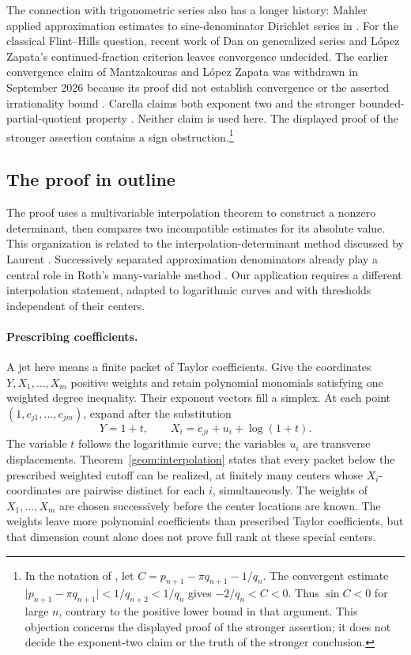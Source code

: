 \documentclass[11pt]{article}
\theoremstyle{definition}
\theoremstyle{remark}
\numberwithin{equation}{section}
\begin{document}
The connection with trigonometric series also has a longer history:
Mahler applied approximation estimates to sine-denominator Dirichlet
series in \cite[Section~16]{mahler1953}. For the classical Flint--Hills
question, recent work of Dan on generalized series \cite{Dan2026}
and L\'opez Zapata's continued-fraction criterion
\cite{LopezZapata2026} leaves convergence undecided. The earlier
convergence claim of Mantzakouras and L\'opez Zapata was withdrawn
in September 2026 because its proof did not establish convergence
or the asserted irrationality bound \cite{MantzakourasLopezZapata2025}.
Carella claims both exponent two and the stronger bounded-partial-quotient
property \cite{Carella2022}. Neither claim is used here. The displayed
proof of the stronger assertion contains a sign obstruction.\footnote{In the notation of
\cite[Theorem~8.1, Equations~(52) and~(55)]{Carella2022}, let
\(C=p_{n+1}-\pi q_{n+1}-1/q_n\). The convergent estimate
\(\lvert p_{n+1}-\pi q_{n+1}\rvert<1/q_{n+2}<1/q_n\)
gives \(-2/q_n<C<0\). Thus \(\sin C<0\) for large \(n\), contrary
to the positive lower bound in that argument. This objection concerns
the displayed proof of the stronger assertion; it does not decide the
exponent-two claim or the truth of the stronger conclusion.}

\subsection{The proof in outline}

The proof uses a multivariable interpolation theorem to construct a
nonzero determinant, then compares two incompatible estimates for its
absolute value. This organization is related to the interpolation-determinant
method discussed by Laurent \cite[Section~6]{laurent1991}.
Successively separated approximation denominators already play a central
role in Roth's many-variable method \cite[Sections~2--3]{roth1960}.
Our application requires a different interpolation statement, adapted to
logarithmic curves and with thresholds independent of their centers.

\paragraph{Prescribing coefficients.}
A jet here means a finite packet of Taylor coefficients. Give the
coordinates \(Y,X_1,\ldots,X_m\) positive weights and retain polynomial
monomials satisfying one weighted degree inequality. Their exponent
vectors fill a simplex. At each point \((1,c_{j1},\ldots,c_{jm})\),
expand after the substitution
\[
 Y=1+t,\qquad X_i=c_{ji}+u_i+\log(1+t).
\]
The variable \(t\) follows the logarithmic curve; the variables \(u_i\)
are transverse displacements. Theorem~\ref{geom:interpolation} states
that every packet below the prescribed weighted cutoff can be realized,
at finitely many centers whose \(X_i\)-coordinates are pairwise distinct
for each \(i\), simultaneously. The weights of \(X_1,\ldots,X_m\)
are chosen successively before the center locations are known.
The weights leave more polynomial coefficients than prescribed Taylor
coefficients, but that dimension count alone does not prove full rank
at these special centers.
\end{document}

